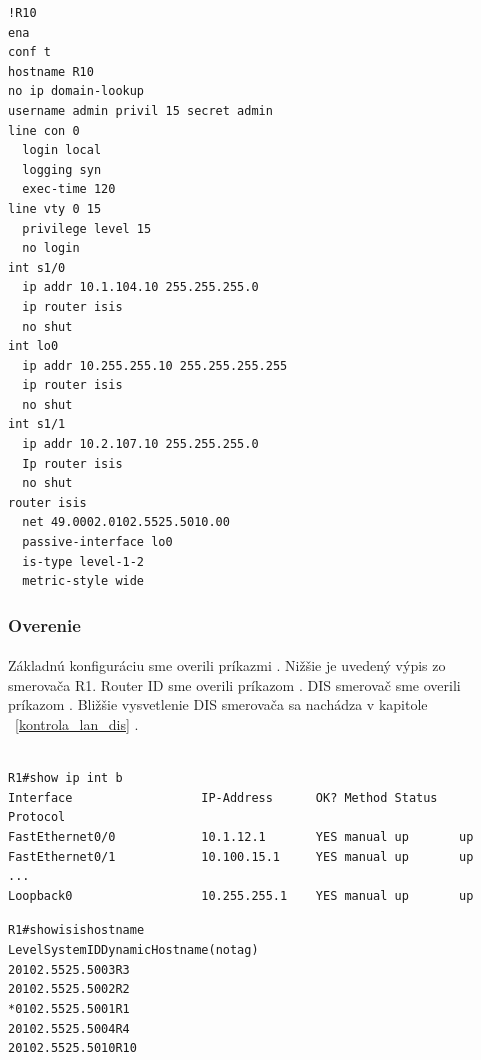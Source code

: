 \documentclass[12pt,twoside,a4paper]{report}
\begin{document}
{\begin{small}
\begin{verbatim}
!R10
ena
conf t
hostname R10
no ip domain-lookup
username admin privil 15 secret admin
line con 0
  login local
  logging syn
  exec-time 120
line vty 0 15
  privilege level 15
  no login
int s1/0
  ip addr 10.1.104.10 255.255.255.0
  ip router isis
  no shut
int lo0
  ip addr 10.255.255.10 255.255.255.255
  ip router isis
  no shut
int s1/1
  ip addr 10.2.107.10 255.255.255.0
  Ip router isis
  no shut
router isis
  net 49.0002.0102.5525.5010.00
  passive-interface lo0
  is-type level-1-2
  metric-style wide
\end{verbatim}
\end{small}
}

\subsubsection{Overenie}
\paragraph{}
Základnú konfiguráciu sme overili príkazmi . Nižšie je uvedený výpis zo smerovača R1. Router ID sme overili príkazom . DIS smerovač sme overili príkazom . Bližšie vysvetlenie DIS smerovača sa nachádza v kapitole ~\ref{kontrola_lan_dis} .

\noindent
{\selectfont
\begin{small}
\begin{verbatim}

R1#show ip int b
Interface                  IP-Address      OK? Method Status   Protocol
FastEthernet0/0            10.1.12.1       YES manual up       up      
FastEthernet0/1            10.100.15.1     YES manual up       up      
...    
Loopback0                  10.255.255.1    YES manual up       up  

\end{verbatim}
\end{small}
}

\noindent
{\selectfont
\begin{small}
\begin{alltt}

R1#show isis hostname
Level  System ID      Dynamic Hostname  (notag)
 2     0102.5525.5003 R3
 2     0102.5525.5002 R2
     * 0102.5525.5001 R1
 2     0102.5525.5004 R4
 2     0102.5525.5010 R10

\end{alltt}
\end{small}
}
\end{document}
